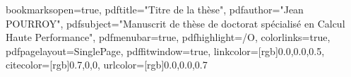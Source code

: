 
\hypersetup
{
bookmarksopen=true,
pdftitle="Titre de la thèse",
pdfauthor="Jean POURROY", %
pdfsubject="Manuscrit de thèse de doctorat spécialisé en Calcul Haute Performance", %
pdfmenubar=true, %
pdfhighlight=/O, %
colorlinks=true, %
pdfpagelayout=SinglePage, %
pdffitwindow=true, %
linkcolor=[rgb]{0.0,0.0,0.5}, %
citecolor=[rgb]{0.7,0,0},%
urlcolor=[rgb]{0.0,0.0,0.7}%
}



\setcounter{secnumdepth}{3}
\setcounter{tocdepth}{2}


\newcommand{\pd}[2]{\frac{\partial #1}{\partial #2}}
\def\abs{\operatorname{abs}}
\def\argmax{\operatornamewithlimits{arg\,max}}
\def\argmin{\operatornamewithlimits{arg\,min}}
\def\diag{\operatorname{Diag}}
\newcommand{\eqRef}[1]{(\ref{#1})}

\usepackage{rotating}                    %



                                                  

                                         
